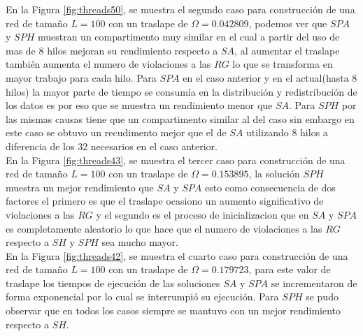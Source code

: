 En la Figura \ref{fig:threads50}, se muestra el segundo caso para construcción de una red de tamaño $L=100$ con un  traslape de $\Omega=0.042809$, podemos ver que $SPA$ y $SPH$ muestran un compartimento muy similar en el cual a partir del uso de mas de 8 hilos mejoran su rendimiento respecto a $SA$, al aumentar el traslape también aumenta el numero de violaciones a las $RG$ lo que se transforma en mayor trabajo para cada hilo. Para $SPA$ en el caso anterior y en el actual(hasta 8 hilos) la mayor parte de tiempo se consumía en la distribución y redistribución de los datos es por eso que se muestra un rendimiento menor que $SA$. Para $SPH$ por las mismas causas tiene que un compartimento similar al del caso  sin embargo en este caso se obtuvo un recudimento mejor que el de $SA$ utilizando 8 hilos a diferencia de los 32 necesarios en el caso anterior.\\

En la Figura \ref{fig:threads43}, se muestra el tercer caso para construcción de una red de tamaño $L=100$ con un traslape de $\Omega=0.153895$, la solución $SPH$ muestra un mejor rendimiento que $SA$ y $SPA$ esto como consecuencia de dos factores el primero es que el traslape ocasiono un aumento significativo de violaciones a las $RG$ y el segundo es el proceso de inicializacion que en $SA$ y $SPA$ es completamente aleatorio lo que hace que el numero de violaciones a las $RG$ respecto a $SH$ y $SPH$ sea mucho mayor.\\

En la Figura \ref{fig:threads42}, se muestra el cuarto caso para construcción de una red de tamaño $L=100$ con un traslape de $\Omega=0.179723$, para este valor de traslape los tiempos de ejecución de las soluciones $SA$ y $SPA$ se incrementaron de forma exponencial por lo cual se interrumpió su ejecución. Para $SPH$ se pudo observar que en todos los casos siempre se mantuvo con un mejor rendimiento respecto a $SH$.\\

